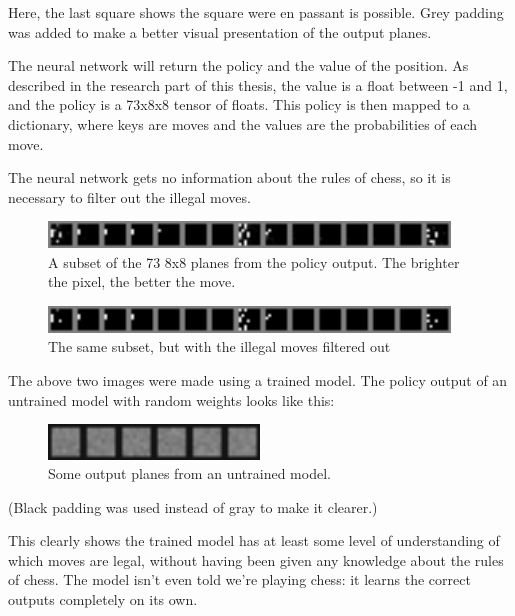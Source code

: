 \documentclass{article}
\begin{document}
Here, the last square shows the square were en passant is possible.
Grey padding was added to make a better visual presentation of the output planes.

The neural network will return the policy and the value of the position.
As described in the research part of this thesis, the value is a float between -1 and 1, and the 
policy is a 73x8x8 tensor of floats. This policy is then mapped to a dictionary, where keys are moves and 
the values are the probabilities of each move.

The neural network gets no information about the rules of chess, so it is necessary to filter
out the illegal moves. 

\begin{figure}[H]
    \centering
    \includegraphics[width=0.95\textwidth]{img/output-planes/unfiltered.png}
    \caption{A subset of the 73 8x8 planes from the policy output. The brighter the pixel, the better the move.}
\end{figure}

\begin{figure}[H]
    \centering
    \includegraphics[width=0.95\textwidth]{img/output-planes/filtered.png}
    \caption{The same subset, but with the illegal moves filtered out}
\end{figure}

The above two images were made using a trained model. The policy output of an untrained model with random weights 
looks like this:

\begin{figure}[H]
    \centering
    \includegraphics[width=0.5\textwidth]{img/output-planes/random-model-unfiltered.png}
    \caption{Some output planes from an untrained model.}
\end{figure}

(Black padding was used instead of gray to make it clearer.)

This clearly shows the trained model has at least some level of understanding of which moves are legal, 
without having been given any knowledge about the rules of chess. The model isn't even told we're playing chess: it
learns the correct outputs completely on its own. 
\end{document}
